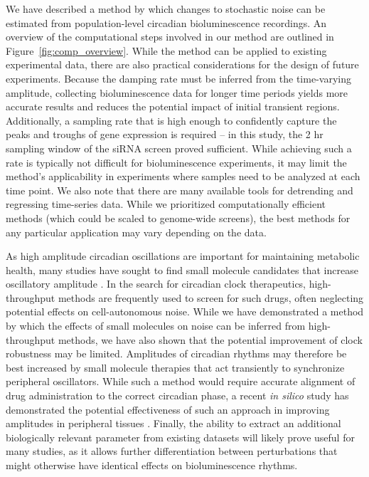 \documentclass[11pt, letterpaper]{article}
\begin{document}
We have described a method by which changes to stochastic noise can be estimated from population-level circadian bioluminescence recordings.
An overview of the computational steps involved in our method are outlined in Figure~\ref{fig:comp_overview}.
While the method can be applied to existing experimental data, there are also practical considerations for the design of future experiments.
Because the damping rate must be inferred from the time-varying amplitude, collecting bioluminescence data for longer time periods yields more accurate results and reduces the potential impact of initial transient regions.
Additionally, a sampling rate that is high enough to confidently capture the peaks and troughs of gene expression is required -- in this study, the 2 hr sampling window of the siRNA screen proved sufficient.
While achieving such a rate is typically not difficult for bioluminescence experiments, it may limit the method's applicability in experiments where samples need to be analyzed at each time point.
We also note that there are many available tools for detrending and regressing time-series data.
While we prioritized computationally efficient methods (which could be scaled to genome-wide screens), the best methods for any particular application may vary depending on the data.

As high amplitude circadian oscillations are important for maintaining metabolic health, many studies have sought to find small molecule candidates that increase oscillatory amplitude \cite{Chen2013}.
In the search for circadian clock therapeutics, high-throughput methods are frequently used to screen for such drugs, often neglecting potential effects on cell-autonomous noise.
While we have demonstrated a method by which the effects of small molecules on noise can be inferred from high-throughput methods, we have also shown that the potential improvement of clock robustness may be limited.
Amplitudes of circadian rhythms may therefore be best increased by small molecule therapies that act transiently to synchronize peripheral oscillators.
While such a method would require accurate alignment of drug administration to the correct circadian phase, a recent {\itshape in silico} study has demonstrated the potential effectiveness of such an approach in improving amplitudes in peripheral tissues \cite{St.John2014a}.
Finally, the ability to extract an additional biologically relevant parameter from existing datasets will likely prove useful for many studies, as it allows further differentiation between perturbations that might otherwise have identical effects on bioluminescence rhythms.
\end{document}
